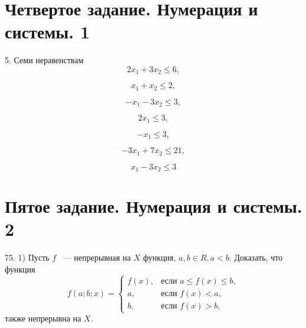 \documentclass[a4paper,12pt]{article} %
\begin{document}
	\newpage
	\section{Четвертое задание. Нумерация и системы. 1}
	5. Семи неравенствам
	\begin{equation}
		2x_1 + 3x_2 \leqslant 6,
	\end{equation}

	\begin{equation}
		x_1 + x_2 \leqslant 2, 
	\end{equation}

	\begin{equation}
		-x_1 - 3x_2 \leqslant 3,		
	\end{equation}

	\begin{equation}
		2x_1 \leqslant 3,		
	\end{equation}

	\begin{equation}
		-x_1 \leqslant 3,
	\end{equation}

	\begin{equation}
		-3x_1 + 7x_2 \leqslant 21,		
	\end{equation}

	\begin{equation}
		x_1 - 3x_2 \leqslant 3		
	\end{equation}
	
	\newpage
	\section{Пятое задание. Нумерация и системы. 2}
	75. 1) Пусть $f$ ~--- непрерывная на $X$ функция, $a, b \in R, a < b.$ Доказать, что функция
	\[
		f(a;b;x)=\begin{cases}
			f \left(x \right), &\text{если } a \leqslant f \left(x \right) \leqslant b, \\
		a, &\text{если } f \left(x \right) < a, \\
		b, &\text{если } f \left(x \right) > b,
		\end{cases}
	\]
	также непрерывна на $X.$
	
	\newpage
\end{document}
